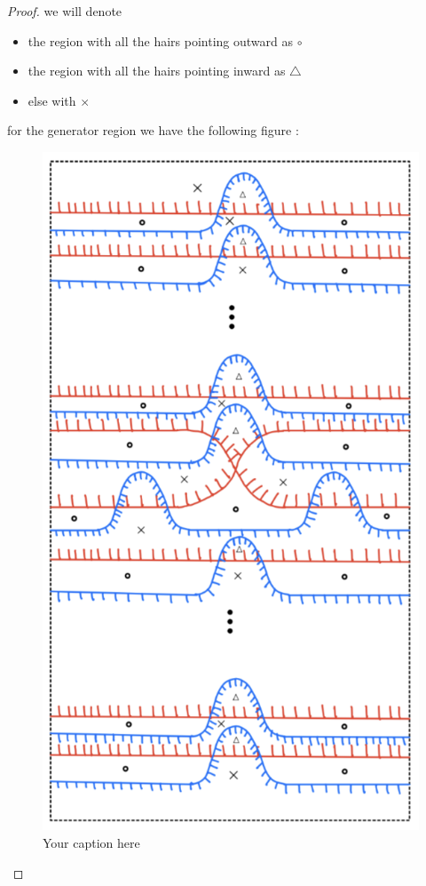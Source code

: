 \begin{proof}
we will denote
 
\begin{itemize}
\item the region with all the hairs pointing outward as $\circ$
\item the region with all the hairs pointing inward as $\bigtriangleup$
\item else with $\times$
\end{itemize}

for the generator region we have the following figure :

\begin{figure}[H] 
    \centering
    \includegraphics[scale = 0.95]{diagrams/natural_alternating_diagrams/11.png}
    \caption{Your caption here}
    \label{fig:your-label}
\end{figure}


\end{proof}
